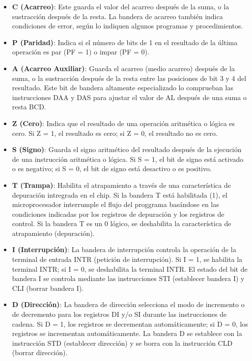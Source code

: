 	\begin{itemize}
		\item \textbf{C (Acarreo)}: Este guarda el valor del acarreo después de la suma, o
			la sustracción después de la resta. La bandera de acarreo también indica condiciones
			de error, según lo indiquen algunos programas y procedimientos.

		\item \textbf{P (Paridad)}: Indica si el número de bits de 1 en el resultado de la
			última operación es par (PF = 1) o impar (PF = 0).

		\item \textbf{A (Acarreo Auxiliar)}: Guarda el acarreo (medio acarreo) después de la
			suma, o la sustracción después de la resta entre las posiciones de bit 3 y 4
			del resultado. Este bit de bandera altamente especializado lo comprueban las instrucciones
			DAA y DAS para ajustar el valor de AL después de una suma o resta BCD.

		\item \textbf{Z (Cero)}: Indica que el resultado de una operación aritmética o lógica
			es cero. Si Z = 1, el resultado es cero; si Z = 0, el resultado no es cero.

		\item \textbf{S (Signo)}: Guarda el signo aritmético del resultado después de la ejecución
			de una instrucción aritmética o lógica. Si S = 1, el bit de signo está activado
			o es negativo; si S = 0, el bit de signo está desactivo o es positivo.

		\item \textbf{T (Trampa)}: Habilita el atrapamiento a través de una característica
			de depuración intregrada en el chip. Si la bandera T está habilitada (1), el microprocesador
			interrumple el flujo del proggrama basándose en las condiciones indicadas por los
			registros de depuración y los registros de control. Si la bandera T es un 0
			lógico, se deshabilita la característica de atrapamiento (depuración).

		\item \textbf{I (Interrupción)}: La bandera de interrupción controla la operación de
			la terminal de entrada INTR (petición de interrupción). Si I = 1, se habilita la
			terminal INTR; si I = 0, se deshabilita la terminal INTR. El estado del bit de
			bandera I se controla mediante las instrucciones STI (establecer bandera I) y
			CLI (borrar bandera I).

		\item \textbf{D (Dirección)}: La bandera de dirección selecciona el modo de incremento
			o de decremento para los registros DI y/o SI durante las instrucciones de cadena.
			Si D = 1, los registros se decrementan automáticamente; si D = 0, los registros
			se incrementan automáticamente. La bandera D se establece con la instrucción
			STD (establecer dirección) y se borra con la instrucción CLD (borrar dirección).


\end{itemize}
